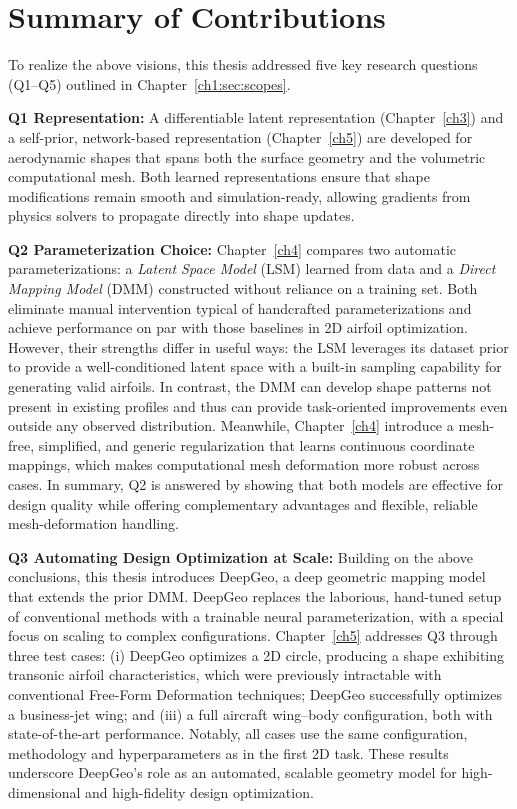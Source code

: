 \section{Summary of Contributions}

To realize the above visions, this thesis addressed five key research questions (Q1–Q5) outlined in Chapter~\ref{ch1:sec:scopes}.

\textbf{Q1 Representation:} A differentiable latent representation (Chapter~\ref{ch3}) and a self-prior, network-based representation (Chapter~\ref{ch5}) are developed for aerodynamic shapes that spans both the surface geometry and the volumetric computational mesh. Both learned representations ensure that shape modifications remain smooth and simulation-ready, allowing gradients from physics solvers to propagate directly into shape updates.

\textbf{Q2 Parameterization Choice:} Chapter~\ref{ch4} compares two automatic parameterizations: a \emph{Latent Space Model} (LSM) learned from data and a \emph{Direct Mapping Model} (DMM) constructed without reliance on a training set. Both eliminate manual intervention typical of handcrafted parameterizations and achieve performance on par with those baselines in 2D airfoil optimization. However, their strengths differ in useful ways: the LSM leverages its dataset prior to provide a well-conditioned latent space with a built-in sampling capability for generating valid airfoils. In contrast, the DMM can develop shape patterns not present in existing profiles and thus can provide task-oriented improvements even outside any observed distribution. Meanwhile, Chapter~\ref{ch4} introduce a mesh-free, simplified, and generic regularization that learns continuous coordinate mappings, which makes computational mesh deformation more robust across cases. In summary, Q2 is answered by showing that both models are effective for design quality while offering complementary advantages and flexible, reliable mesh-deformation handling.

\textbf{Q3 Automating Design Optimization at Scale:} Building on the above conclusions, this thesis introduces DeepGeo, a deep geometric mapping model that extends the prior DMM. DeepGeo replaces the laborious, hand-tuned setup of conventional methods with a trainable neural parameterization, with a special focus on scaling to complex configurations. Chapter~\ref{ch5} addresses Q3 through three test cases: (i) DeepGeo optimizes a 2D circle, producing a shape exhibiting transonic airfoil characteristics, which were previously intractable with conventional Free-Form Deformation techniques; DeepGeo successfully optimizes a business-jet wing; and (iii) a full aircraft wing–body configuration, both with state-of-the-art performance. Notably, all cases use the same configuration, methodology and hyperparameters as in the first 2D task. These results underscore DeepGeo’s role as an automated, scalable geometry model for high-dimensional and high-fidelity design optimization.

